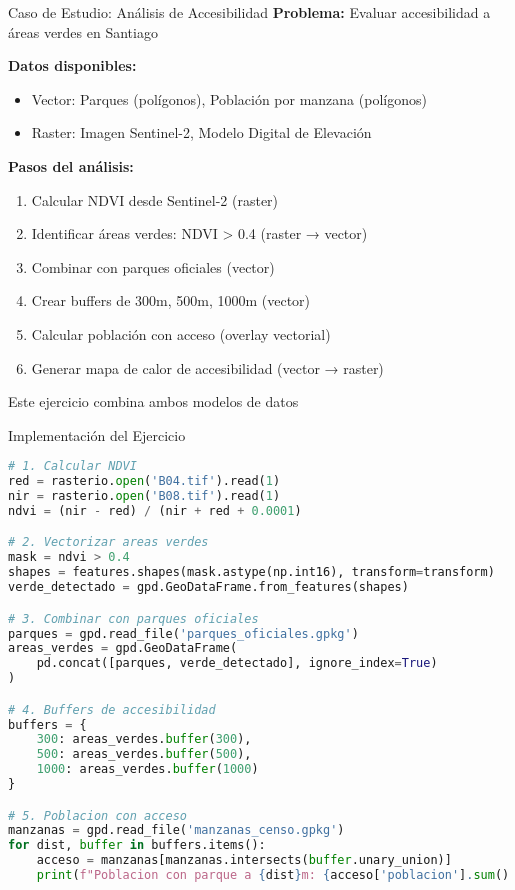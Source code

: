 \documentclass[10pt]{beamer}
\begin{document}
\begin{frame}{Caso de Estudio: Análisis de Accesibilidad}
    \textbf{Problema:} Evaluar accesibilidad a áreas verdes en Santiago
    
    \vspace{0.3cm}
    
    \textbf{Datos disponibles:}
    \begin{itemize}
        \item Vector: Parques (polígonos), Población por manzana (polígonos)
        \item Raster: Imagen Sentinel-2, Modelo Digital de Elevación
    \end{itemize}
    
    \vspace{0.3cm}
    
    \textbf{Pasos del análisis:}
    \begin{enumerate}
        \item Calcular NDVI desde Sentinel-2 (raster)
        \item Identificar áreas verdes: NDVI > 0.4 (raster → vector)
        \item Combinar con parques oficiales (vector)
        \item Crear buffers de 300m, 500m, 1000m (vector)
        \item Calcular población con acceso (overlay vectorial)
        \item Generar mapa de calor de accesibilidad (vector → raster)
    \end{enumerate}
    
    \begin{tcolorbox}[colframe=green!50,colback=green!5]
        \centering
        Este ejercicio combina ambos modelos de datos
    \end{tcolorbox}
\end{frame}

\begin{frame}[fragile]{Implementación del Ejercicio}
    \begin{lstlisting}[language=Python, caption=Solución integrada]
# 1. Calcular NDVI
red = rasterio.open('B04.tif').read(1)
nir = rasterio.open('B08.tif').read(1)
ndvi = (nir - red) / (nir + red + 0.0001)

# 2. Vectorizar areas verdes
mask = ndvi > 0.4
shapes = features.shapes(mask.astype(np.int16), transform=transform)
verde_detectado = gpd.GeoDataFrame.from_features(shapes)

# 3. Combinar con parques oficiales
parques = gpd.read_file('parques_oficiales.gpkg')
areas_verdes = gpd.GeoDataFrame(
    pd.concat([parques, verde_detectado], ignore_index=True)
)

# 4. Buffers de accesibilidad
buffers = {
    300: areas_verdes.buffer(300),
    500: areas_verdes.buffer(500),
    1000: areas_verdes.buffer(1000)
}

# 5. Poblacion con acceso
manzanas = gpd.read_file('manzanas_censo.gpkg')
for dist, buffer in buffers.items():
    acceso = manzanas[manzanas.intersects(buffer.unary_union)]
    print(f"Poblacion con parque a {dist}m: {acceso['poblacion'].sum():,}")
    \end{lstlisting}
\end{frame}
\end{document}
